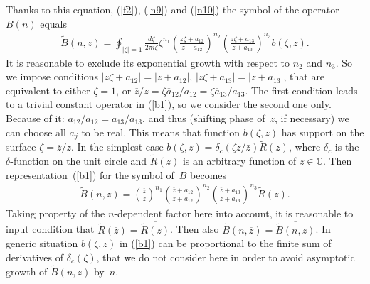 \documentclass[pdftex]{sigma}
\numberwithin{equation}{section}
\begin{document}
Thanks to this equation, (\ref{f2}), (\ref{n9}) and (\ref{n10}) the symbol of the operator $B(n)$ equals
\begin{gather}
\widetilde{B}(n,z)=\oint_{|\zeta|=1}\frac{d\zeta}{2\pi i\zeta}\zeta^{n_1}\left(\frac{z\zeta+a_{12}}{z+a_{12}}\right)^{n_2}
\left(\frac{z\zeta+a_{13}}{z+a_{13}}\right)^{n_3}b(\zeta,z).\label{b1}
\end{gather}
It is reasonable to exclude its exponential growth with respect to $n_2$ and $n_3$. So we impose conditions $|z\zeta+a_{12}|=|z+a_{12}|$, $|z\zeta+a_{13}|=|z+a_{13}|$, that are equivalent to either $\zeta=1$, or  $\overline{z}/{z} =\zeta\overline{a}_{12}/a_{12} =\zeta\overline{a}_{13}/a_{13}$. The f\/irst condition leads to a trivial constant operator in (\ref{b1}), so we consider the second one only. Because of it: $\overline{a}_{12}/a_{12}=\overline{a}_{13}/a_{13}$, and thus (shifting phase of~$z$, if necessary) we can choose all $a_j$ to be real. This means that function $b(\zeta,z)$ has support on the surface $\zeta=\overline{z}/z$. In the simplest case $b(\zeta,z)= \delta_{c}(\zeta{z}/\bar{z})\widetilde{R}(z)$, where $\delta_{c}$ is the $\delta$-function on the unit circle and $\widetilde{R}(z)$ is an arbitrary function of $z\in\mathbb{C}$. Then representation~(\ref{b1}) for the symbol of~$B$ becomes
\begin{gather}
\widetilde{B}(n,z)=\left(\frac{\overline{z}}{z}\right)^{n_1}\left(\frac{\overline{z}+a_{12}}{z+a_{12}}\right)^{n_2}
 \left(\frac{\overline{z}+a_{13}}{z+a_{13}}\right)^{n_3}\widetilde{R}(z).\label{n11}
\end{gather}
Taking property of the $n$-dependent factor here into account, it is reasonable to input condition that $\widetilde{R}(\overline{z})= \overline{\widetilde{R}(z)}$. Then also $\widetilde{B}(n,\overline{z})=\overline{\widetilde{B}(n,z)}$. In generic situation $b(\zeta,z)$ in (\ref{b1}) can be proportional to the f\/inite sum of derivatives of $\delta_{c}(\zeta)$, that we do not consider here in order to avoid asymptotic growth of $\widetilde{B}(n,z)$ by~$n$.
\end{document}
